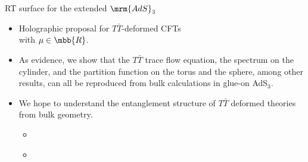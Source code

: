 \documentclass[10pt]{article}
\newcommand{\TTbar}{\texorpdfstring{\ensuremath{T\bar{T}}}{TTbar}\xspace}
\begin{document}
\begin{multicols}{3}
\begin{center}
	\vspace{-1\baselineskip}
	RT surface for the extended $\mrm{AdS}_3$
\end{center}


\begin{itemize}
\item Holographic proposal for $T\bar T$-deformed CFTs\\
with $\mu \in \mbb{R}$.

\item As evidence, we show that the $T\bar T$ trace flow equation, the spectrum on the cylinder, and the partition function on the torus and the sphere, among other results, can all be reproduced from bulk calculations in glue-on AdS$_3$.

\item We hope to understand the entanglement structure of \TTbar deformed theories from bulk geometry. 
	\begin{itemize}
	\item \textcite{Donnelly:2018bef,Lewkowycz:2019xse}
	\item \textcite{He:2023xnb,He:2023wko,Tian:2023fgf,Hou:2023ytl}
	\end{itemize}
\end{itemize}


\renewcommand*{\bibfont}{\footnotesize}
\printbibliography %

\end{multicols}
\end{document}
